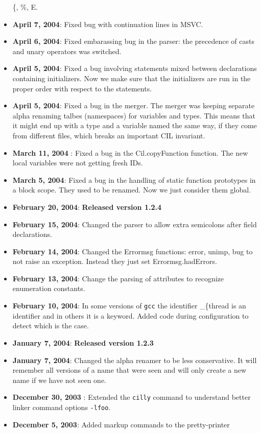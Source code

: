 \documentclass[letterpaper]{article}
\def\t#1{{\tt #1}}
\begin{document}
\begin{itemize}
\{, \%, E. 
\item {\bf April 7, 2004}: Fixed bug with continuation lines in MSVC.
\item {\bf April 6, 2004}: Fixed embarassing bug in the parser: the precedence
  of casts and unary operators was switched. 
\item {\bf April 5, 2004}: Fixed a bug involving statements mixed between
declarations containing initializers. Now we make sure that the initializers
are run in the proper order with respect to the statements.
\item {\bf April 5, 2004}: Fixed a bug in the merger. The merger was keeping
separate alpha renaming talbes (namespaces) for variables and types. This
means that it might end up with a type and a variable named the same way, if
they come from different files, which breaks an important CIL invariant.
\item {\bf March 11, 2004} : Fixed a bug in the Cil.copyFunction function. The
new local variables were not getting fresh IDs. 
\item {\bf March 5, 2004}: Fixed a bug in the handling of static function
  prototypes in a block scope. They used to be renamed. Now we just consider
  them global. 
\item {\bf February 20, 2004}: {\bf Released version 1.2.4}
\item {\bf February 15, 2004}: Changed the parser to allow extra semicolons
  after field declarations.
\item {\bf February 14, 2004}: Changed the Errormsg functions: error, unimp,
bug to not raise an exception. Instead they just set Errormsg.hadErrors. 
\item {\bf February 13, 2004}: Change the parsing of attributes to recognize
  enumeration constants.
\item {\bf February 10, 2004}: In some versions of \t{gcc} the identifier
  {\_\{thread} is an identifier and in others it is a keyword. Added code
  during configuration to detect which is the case. 
\item {\bf January 7, 2004}: {\bf Released version 1.2.3}
\item {\bf January 7, 2004}: Changed the alpha renamer to be less
conservative. It will remember all versions of a name that were seen and will
only create a new name if we have not seen one. 
\item {\bf December 30, 2003} : Extended the \t{cilly} command to understand
  better linker command options \t{-lfoo}. 
\item {\bf December 5, 2003}: Added markup commands to the pretty-printer

\end{itemize}
\end{document}
